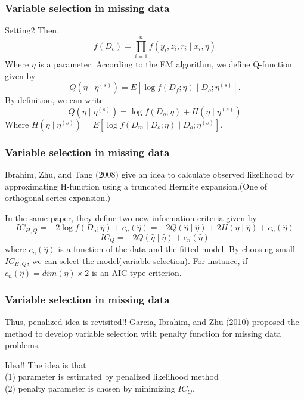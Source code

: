 \documentclass{beamer}
\begin{document}
\begin{frame}
\frametitle{Variable selection in missing data}
\begin{block}{Setting2}
Then,
$$
f(D_c) = \prod _{i=1} ^n f( y_i, z_i, r_i \mid x_i , \eta ) 
$$
Where $\eta$ is a parameter. According to the EM algorithm, we define Q-function given by
$$
Q(\eta \mid \eta^{(s)} ) = E[ \log f(D_{f}; \eta) \mid D_{o} ; \eta^{(s)} ]. 
$$
By definition, we can write
$$
Q(\eta \mid \eta^{(s)} ) = \log f(D_{o}; \eta)  + H(\eta \mid \eta^{(s)} )
$$
Where $ H(\eta \mid \eta^{(s)} ) = E[ \log f(D_{m} \mid D_{o} ; \eta) \mid D_{o} ; \eta^{(s)} ] $.
\end{block}
\end{frame}
\begin{frame}
\frametitle{Variable selection in missing data}
Ibrahim, Zhu, and Tang (2008) give an idea to calculate observed likelihood by approximating H-function using a truncated Hermite expansion.(One of orthogonal series expansion.) 

In the same paper, they define two new information criteria given by
$$
IC_{H,Q} = -2 \log f(D_{o}; \hat{\eta}) + c_n (\hat{\eta} ) = -2 Q(\hat{\eta} \mid \hat{\eta}) +2 H(\hat{\eta} \mid \hat{\eta}) +  c_n (\hat{\eta} )  
$$
$$
IC_{Q} =-2 Q(\hat{\eta} \mid \hat{\eta}) +  c_n (\hat{\eta} )  
$$
where $c_n (\hat{\eta})$ is a function of the data and the fitted model. By choosing small $IC_{H,Q}$, we can select the model(variable selection).
For instance, if $c_n (\hat{\eta})= dim(\eta) \times 2$ is an AIC-type criterion.
\end{frame}
\begin{frame}
\frametitle{Variable selection in missing data}
Thus, penalized idea is revisited!! Garcia, Ibrahim, and Zhu (2010) proposed the method to develop variable selection with penalty function for missing data problems.
\begin{block}{Idea!!}
The idea is that \\
(1) parameter is estimated by penalized likelihood method \\
(2) penalty parameter is chosen by minimizing $IC_{Q}$.
\end{block}
\end{frame}
\end{document}
